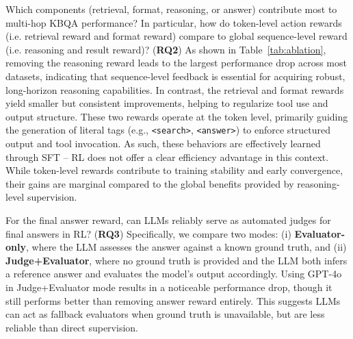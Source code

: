 \documentclass[10pt,conference]{IEEEtran}
\begin{document}
\noindent Which components (retrieval, format, reasoning, or answer) contribute most to multi-hop KBQA performance? In particular, how do token-level action rewards (i.e. retrieval reward and format reward) compare to global sequence-level reward (i.e. reasoning and result reward)? (\textbf{RQ2})
As shown in Table~\ref{tab:ablation}, removing the reasoning reward leads to the largest performance drop across most datasets, indicating that sequence-level feedback is essential for acquiring robust, long-horizon reasoning capabilities. In contrast, the retrieval and format rewards yield smaller but consistent improvements, helping to regularize tool use and output structure. These two rewards operate at the token level, primarily guiding the generation of literal tags (e.g., \texttt{<search>}, \texttt{<answer>}) to enforce structured output and tool invocation. As such, these behaviors are effectively learned through SFT --  RL does not offer a clear efficiency advantage in this context. While token-level rewards contribute to training stability and early convergence, their gains are marginal compared to the global benefits provided by reasoning-level supervision.

\noindent For the final answer reward, can LLMs reliably serve as automated judges for final answers in RL? (\textbf{RQ3}) 
Specifically, we compare two modes: (i) \textbf{Evaluator-only}, where the LLM assesses the answer against a known ground truth, and (ii) \textbf{Judge+Evaluator}, where no ground truth is provided and the LLM both infers a reference answer and evaluates the model’s output accordingly.
Using GPT-4o in Judge+Evaluator mode results in a noticeable performance drop, though it still performs better than removing answer reward entirely. This suggests LLMs can act as fallback evaluators when ground truth is unavailable, but are less reliable than direct supervision.


\end{document}
